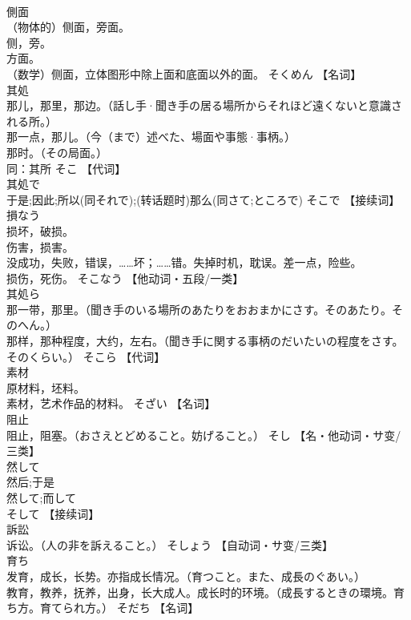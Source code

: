 \documentclass[8pt]{extreport}
\begin{document}
\begin{CJK}{UTF8}{min}
\\	側面	
\\	（物体的）侧面，旁面。 
\\	侧，旁。 
\\	方面。 
\\	（数学）侧面，立体图形中除上面和底面以外的面。	そくめん		【名词】
\\	其処	
\\	那儿，那里，那边。（話し手·聞き手の居る場所からそれほど遠くないと意識される所。） 
\\	那一点，那儿。（今（まで）述べた、場面や事態·事柄。） 
\\	那时。（その局面。） 
\\	同：其所	そこ		【代词】
\\	其処で	
\\	于是;因此;所以(同それで);(转话题时)那么(同さて;ところで)	そこで		【接续词】
\\	損なう	
\\	损坏，破损。 
\\	伤害，损害。 
\\	没成功，失败，错误，……坏；……错。失掉时机，耽误。差一点，险些。 
\\	损伤，死伤。	そこなう		【他动词・五段/一类】
\\	其処ら	
\\	那一带，那里。（聞き手のいる場所のあたりをおおまかにさす。そのあたり。そのへん。） 
\\	那样，那种程度，大约，左右。（聞き手に関する事柄のだいたいの程度をさす。そのくらい。）	そこら		【代词】
\\	素材	
\\	原材料，坯料。 
\\	素材，艺术作品的材料。	そざい		【名词】
\\	阻止	
\\	阻止，阻塞。（おさえとどめること。妨げること。）	そし		【名・他动词・サ变/三类】
\\	然して	
\\	然后;于是 
\\	然して;而して 
\\	そして		【接续词】
\\	訴訟	
\\	诉讼。（人の非を訴えること。）	そしょう		【自动词・サ变/三类】
\\	育ち	
\\	发育，成长，长势。亦指成长情况。（育つこと。また、成長のぐあい。） 
\\	教育，教养，抚养，出身，长大成人。成长时的环境。（成長するときの環境。育ち方。育てられ方。）	そだち		【名词】

\end{CJK}
\end{document}
